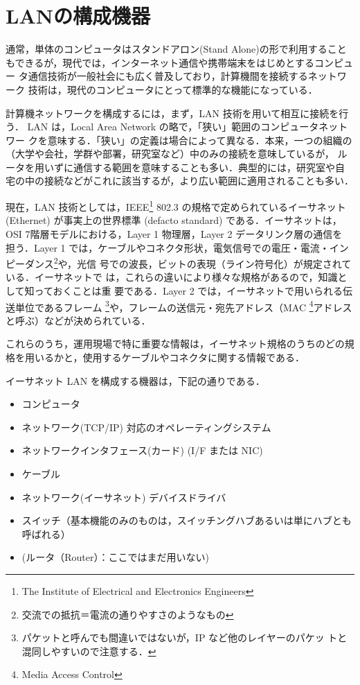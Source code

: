 \section{LANの構成機器}
通常，単体のコンピュータはスタンドアロン(Stand Alone)の形で利用すること
もできるが，現代では，インターネット通信や携帯端末をはじめとするコンピュー
タ通信技術が一般社会にも広く普及しており，計算機間を接続するネットワーク
技術は，現代のコンピュータにとって標準的な機能になっている．

計算機ネットワークを構成するには，まず，LAN 技術を用いて相互に接続を行う．
LAN は，Local Area Network の略で，「狭い」範囲のコンピュータネットワー
クを意味する．「狭い」の定義は場合によって異なる．本来，一つの組織の
（大学や会社，学群や部署，研究室など）中のみの接続を意味しているが，
ルータを用いずに通信する範囲を意味することも多い．典型的には，研究室や自
宅の中の接続などがこれに該当するが，より広い範囲に適用されることも多い．

現在，LAN 技術としては，IEEE\footnote{The Institute of Electrical and
Electronics Engineers} 802.3 の規格で定められているイーサネット
(Ethernet) が事実上の世界標準 (defacto standard) である．イーサネットは，
OSI 7階層モデルにおける，Layer 1 物理層，Layer 2 データリンク層の通信を
担う．Layer 1 では，ケーブルやコネクタ形状，電気信号での電圧・電流・イン
ピーダンス\footnote{交流での抵抗＝電流の通りやすさのようなもの}や，光信
号での波長，ビットの表現（ライン符号化）が規定されている．イーサネットで
は，これらの違いにより様々な規格があるので，知識として知っておくことは重
要である．Layer 2 では，イーサネットで用いられる伝送単位であるフレーム
\footnote{パケットと呼んでも間違いではないが，IP など他のレイヤーのパケッ
トと混同しやすいので注意する．}や，フレームの送信元・宛先アドレス（MAC
\footnote{Media Access Control}アドレスと呼ぶ）などが決められている．

これらのうち，運用現場で特に重要な情報は，イーサネット規格のうちのどの規
格を用いるかと，使用するケーブルやコネクタに関する情報である．

イーサネット LAN を構成する機器は，下記の通りである．

\begin{itemize}
\item コンピュータ
\item ネットワーク(TCP/IP) 対応のオペレーティングシステム
\item ネットワークインタフェース(カード) (I/F または NIC)
\item ケーブル
\item ネットワーク(イーサネット) デバイスドライバ
\item スイッチ（基本機能のみのものは，スイッチングハブあるいは単にハブとも呼ばれる）
\item (ルータ（Router）：ここではまだ用いない)
\end{itemize}

